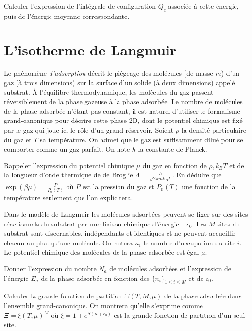 \documentclass[utf8, 11pt]{feuille}
\begin{document}
\question
Calculer l'expression de l'intégrale de configuration $Q_c$ associée à cette énergie, puis de l'énergie moyenne correspondante.



\section{L'isotherme de Langmuir}

Le phénomène {\it d'adsorption} décrit le piégeage des molécules (de masse $m$) d'un gaz (à trois dimensions) sur la surface d'un solide (à deux dimensions) appelé substrat.  \`A l'équilibre thermodynamique, les molécules du gaz passent réversiblement de la phase gazeuse à la phase adsorbée.  Le nombre de molécules de la phase adsorbée n'étant pas constant, il est naturel d'utiliser le formalisme grand-canonique pour décrire cette phase 2D, dont le potentiel chimique est fixé par le gaz qui joue ici le rôle d'un grand réservoir. Soient $\rho$ la densité particulaire du gaz et $T$ sa température. On admet que le gaz est suffisamment dilué pour se comporter comme un gaz parfait. On note $h$ la constante de Planck.

\question
Rappeler l'expression du potentiel chimique $\mu$ du gaz en fonction de $\rho, k_B T$ et de la longueur d'onde thermique de de Broglie $\Lambda=\frac{h}{\sqrt{2\pi m k_B T}}$. En déduire que $\exp(\beta \mu)=\frac{P}{P_0(T)}$ où $P$ est la pression du gaz et $P_0(T)$ une fonction de la température seulement que l'on explicitera.

Dans le modèle de Langmuir les molécules adsorbées peuvent se fixer sur des sites réactionnels du substrat par une liaison chimique d'énergie $-\epsilon_0$.  Les $M$ sites du substrat sont discernables, indépendants et identiques et ne peuvent accueillir chacun au plus qu'une molécule.  On notera $n_i$ le nombre d'occupation du site $i$.  Le potentiel chimique des molécules de la phase adsorbée est égal $\mu$.

\question
Donner l'expression du nombre $N_a$ de molécules adsorbées et l'expression de l'énergie $E_a$ de la phase adsorbée en fonction des $\{n_i\}_{1\leq i \leq M}$ et de $\epsilon_0$.

\question
Calculer la grande fonction de partition $\Xi (T,M,\mu)$ de la phase adsorbée dans l'ensemble grand-canonique. On montrera qu'elle s'exprime comme $\Xi=\xi(T,\mu)^M$ où $\xi=1+e^{\beta(\mu+\epsilon_0)}$ est la grande fonction de partition d'un seul site.
\end{document}
